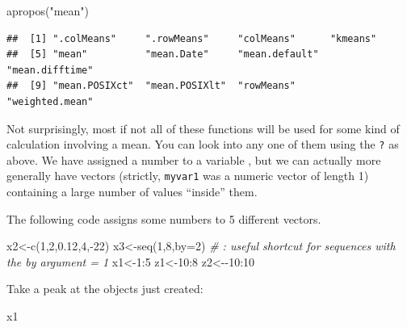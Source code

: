 \documentclass[
]{article}
\newenvironment{Shaded}{\begin{snugshade}}{\end{snugshade}}
\newcommand{\AttributeTok}[1]{\textcolor[rgb]{0.77,0.63,0.00}{#1}}
\newcommand{\CommentTok}[1]{\textcolor[rgb]{0.56,0.35,0.01}{\textit{#1}}}
\newcommand{\DecValTok}[1]{\textcolor[rgb]{0.00,0.00,0.81}{#1}}
\newcommand{\FloatTok}[1]{\textcolor[rgb]{0.00,0.00,0.81}{#1}}
\newcommand{\FunctionTok}[1]{\textcolor[rgb]{0.00,0.00,0.00}{#1}}
\newcommand{\NormalTok}[1]{#1}
\newcommand{\OtherTok}[1]{\textcolor[rgb]{0.56,0.35,0.01}{#1}}
\newcommand{\SpecialCharTok}[1]{\textcolor[rgb]{0.00,0.00,0.00}{#1}}
\newcommand{\StringTok}[1]{\textcolor[rgb]{0.31,0.60,0.02}{#1}}
\begin{document}
\begin{Shaded}
\begin{Highlighting}[]
\FunctionTok{apropos}\NormalTok{(}\StringTok{"mean"}\NormalTok{)}
\end{Highlighting}
\end{Shaded}

\begin{verbatim}
##  [1] ".colMeans"     ".rowMeans"     "colMeans"      "kmeans"       
##  [5] "mean"          "mean.Date"     "mean.default"  "mean.difftime"
##  [9] "mean.POSIXct"  "mean.POSIXlt"  "rowMeans"      "weighted.mean"
\end{verbatim}

Not surprisingly, most if not all of these functions will be used for
some kind of calculation involving a mean. You can look into any one of
them using the \texttt{?} as above. We have assigned a number to a
variable , but we can actually more generally have vectors (strictly,
\texttt{myvar1} was a numeric vector of length 1) containing a large
number of values ``inside'' them.

The following code assigns some numbers to 5 different vectors.

\begin{Shaded}
\begin{Highlighting}[]
\NormalTok{x2}\OtherTok{\textless{}{-}}\FunctionTok{c}\NormalTok{(}\DecValTok{1}\NormalTok{,}\DecValTok{2}\NormalTok{,}\FloatTok{0.12}\NormalTok{,}\DecValTok{4}\NormalTok{,}\SpecialCharTok{{-}}\DecValTok{22}\NormalTok{)}
\NormalTok{x3}\OtherTok{\textless{}{-}}\FunctionTok{seq}\NormalTok{(}\DecValTok{1}\NormalTok{,}\DecValTok{8}\NormalTok{,}\AttributeTok{by=}\DecValTok{2}\NormalTok{)}
\CommentTok{\# : useful shortcut for sequences with the by argument = 1}
\NormalTok{x1}\OtherTok{\textless{}{-}}\DecValTok{1}\SpecialCharTok{:}\DecValTok{5}
\NormalTok{z1}\OtherTok{\textless{}{-}}\DecValTok{10}\SpecialCharTok{:}\DecValTok{8}
\NormalTok{z2}\OtherTok{\textless{}{-}}\SpecialCharTok{{-}}\DecValTok{10}\SpecialCharTok{:}\DecValTok{10}
\end{Highlighting}
\end{Shaded}

Take a peak at the objects just created:

\begin{Shaded}
\begin{Highlighting}[]
\NormalTok{x1}
\end{Highlighting}
\end{Shaded}
\end{document}
